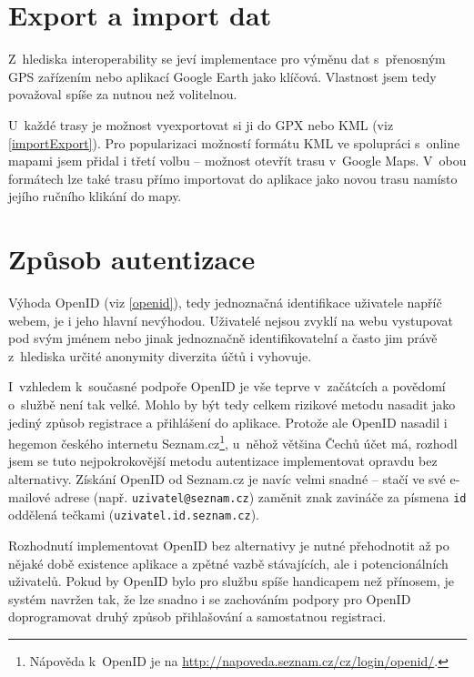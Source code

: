 \section{Export a import dat}
Z~hlediska interoperability se jeví implementace pro výměnu
dat s~přenosným GPS zařízením nebo aplikací Google Earth jako
klíčová. Vlastnost jsem tedy považoval spíše za nutnou než volitelnou.

U~každé trasy je možnost vyexportovat si ji do GPX nebo KML (viz
\ref{importExport}). Pro popularizaci možností formátu KML ve spolupráci s~online mapami jsem
přidal i třetí volbu -- možnost otevřít trasu v~Google Maps. V~obou
formátech lze také trasu přímo importovat do aplikace jako novou trasu
namísto jejího ručního klikání do mapy.

\section{Způsob autentizace}
Výhoda OpenID (viz \ref{openid}), tedy jednoznačná identifikace uživatele
napříč webem, je i jeho hlavní nevýhodou. Uživatelé nejsou zvyklí na webu
vystupovat pod svým jménem nebo jinak jednoznačně identifikovatelní a
často jim právě z~hlediska určité anonymity diverzita účtů i vyhovuje.

I~vzhledem k~současné podpoře OpenID je vše teprve v~začátcích a
povědomí o~službě není tak velké. Mohlo by být tedy celkem rizikové
metodu nasadit jako jediný způsob registrace a přihlášení do aplikace.
Protože ale OpenID nasadil i hegemon českého internetu
Seznam.cz\footnote{Nápověda
k~OpenID je na \url{http://napoveda.seznam.cz/cz/login/openid/}.},
u~něhož většina Čechů účet má, rozhodl jsem se tuto nej\-pokrokovější metodu
autentizace implementovat opravdu bez alternativy. Získání
OpenID od Seznam.cz je navíc velmi snadné -- stačí ve své e-mailové
adrese (např. {\tt uzivatel@seznam.cz}) zaměnit znak zavináče za
písmena {\tt id} oddělená tečkami ({\tt uzivatel.id.seznam.cz}).

Rozhodnutí implementovat OpenID bez alternativy je nutné přehodnotit
až po nějaké době existence aplikace a zpětné vazbě
stávajících, ale i potencionálních uživatelů. Pokud by OpenID
bylo pro službu spíše handicapem než přínosem, je systém navržen tak,
že lze snadno i se zachováním podpory pro OpenID doprogramovat druhý
způsob přihlašování a samostatnou registraci.

